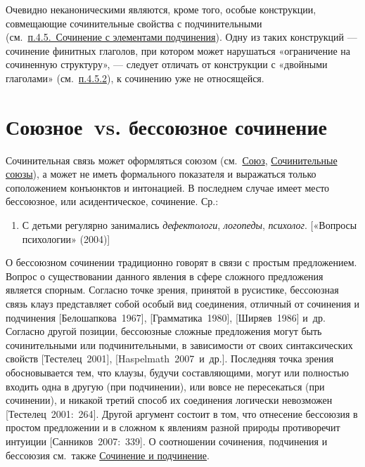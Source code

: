 Очевидно неканоническими являются, кроме того, особые конструкции,
совмещающие сочинительные свойства с подчинительными
(см.~\underline{п.4.5.~Сочинение с элементами подчинения}). Одну из
таких конструкций --- сочинение финитных глаголов, при котором может
нарушаться «ограничение на сочиненную структуру», --- следует отличать от
конструкции с «двойными глаголами» (см.~\underline{п.4.5.2}), к
сочинению уже не относящейся.

\section{Союзное~vs. бессоюзное
сочинение}\label{ux441ux43eux44eux437ux43dux43eux435-vs.-ux431ux435ux441ux441ux43eux44eux437ux43dux43eux435-ux441ux43eux447ux438ux43dux435ux43dux438ux435}

Сочинительная связь может оформляться союзом (см.~\underline{Союз},
\underline{Сочинительные союзы}), а может не иметь формального
показателя и выражаться только соположением конъюнктов и интонацией. В
последнем случае имеет место бессоюзное, или асидентическое, сочинение.
Ср.:

\begin{enumerate}
\def\labelenumi{(\arabic{enumi})}
\setcounter{enumi}{64}
\item
  С детьми регулярно занимались \textit{дефектологи}, \textit{логопеды},
  \textit{психолог}. {[}«Вопросы психологии» (2004){]}
\end{enumerate}

О бессоюзном сочинении традиционно говорят в связи с простым
предложением. Вопрос о существовании данного явления в сфере сложного
предложения является спорным. Согласно точке зрения, принятой в
русистике, бессоюзная связь клауз представляет собой особый вид
соединения, отличный от сочинения и подчинения {[}Белошапкова~1967{]},
{[}Грамматика~1980{]}, {[}Ширяев~1986{]} и~др. Согласно другой позиции,
бессоюзные сложные предложения могут быть сочинительными или
подчинительными, в зависимости от своих синтаксических свойств
{[}Тестелец~2001{]}, {[}Haspelmath~2007~и~др.{]}. Последняя точка зрения
обосновывается тем, что клаузы, будучи составляющими, могут или
полностью входить одна в другую (при подчинении), или вовсе не
пересекаться (при сочинении), и никакой третий способ их соединения
логически невозможен {[}Тестелец~2001:~264{]}. Другой аргумент состоит в
том, что отнесение бессоюзия в простом предложении и в сложном к
явлениям разной природы противоречит интуиции {[}Санников~2007:~339{]}.
О соотношении сочинения, подчинения и бессоюзия см.~также
\underline{Сочинение и подчинение}.

